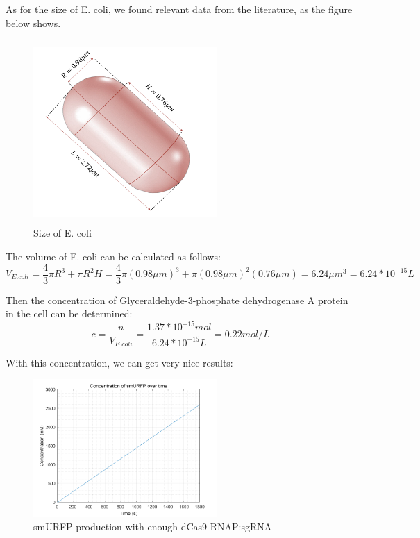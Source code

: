 As for the size of E. coli, we found relevant data from the literature, as the figure below shows.\cite{grossman1982changes}

\begin{figure}[!htbp]
	\centering
	\includegraphics[width=7cm,height=7cm]{dc}
	\caption{Size of E. coli}
\end{figure}

The volume of E. coli can be calculated as follows:
\begin{displaymath}
	V_{E.coli}=\frac{4}{3} \pi R^3+\pi R^2H=\frac{4}{3} \pi (0.98\mu m)^3+\pi (0.98\mu m)^2(0.76\mu m)=6.24\mu m^3=6.24*10^{-15}L
\end{displaymath}

Then the concentration of Glyceraldehyde-3-phosphate dehydrogenase A protein in the cell can be determined:
\begin{displaymath}
	c=\frac{n}{V_{E.coli}}=\frac{1.37*10^{-15}mol}{6.24*10^{-15}L}=0.22mol/L
\end{displaymath}

With this concentration, we can get very nice results:

\begin{figure}[H]
	\centering
	\includegraphics[width=7cm]{23}
	\caption{smURFP production with enough dCas9-RNAP:sgRNA}
\end{figure}

